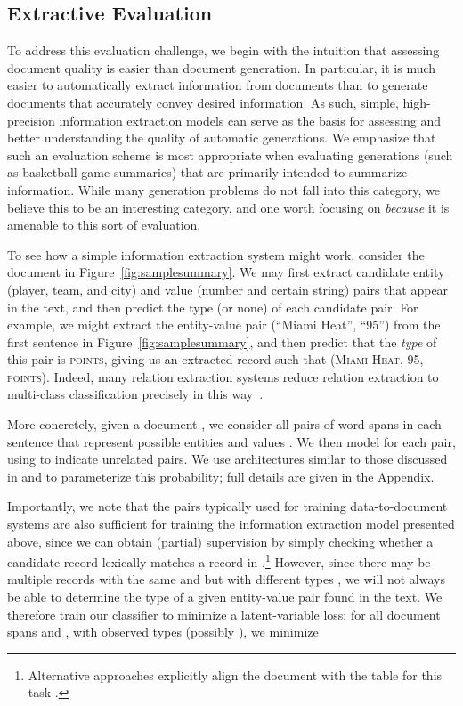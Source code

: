\documentclass[11pt,letterpaper]{article}
\begin{document}
\subsection{Extractive Evaluation}
\label{sec:extractive}
To address this evaluation challenge, we begin with the intuition that assessing document quality is easier than document generation. In particular, it is much easier to automatically extract information from documents than to generate documents that accurately convey desired information. As such, simple, high-precision information extraction models can serve
as the basis for assessing and better understanding the quality of automatic generations. 
We emphasize that such an evaluation scheme is most appropriate when evaluating generations (such as basketball game summaries) that are primarily intended to summarize information. While many generation problems do not fall into this category, we believe this to be an interesting category, and one worth focusing on \textit{because} it is amenable to this sort of evaluation.

To see how a simple information extraction system might work, consider the document in Figure~\ref{fig:samplesummary}. We may first extract candidate entity (player, team, and city) and value (number and
certain string) pairs  that appear in the text, and then predict the type  (or none) of each candidate pair. For example, we might extract the entity-value pair (``Miami Heat'', ``95'') from the first sentence in Figure~\ref{fig:samplesummary}, and then predict that the \textit{type} of this pair is \textsc{points}, giving us an extracted record  such that  (\textsc{Miami Heat}, 95, \textsc{points}). Indeed, many relation extraction systems
reduce relation extraction to multi-class classification precisely in this
way~\citep{zhang2004weakly,zhou2008semi,zeng2014relation,dosSantos2015classifying}. 

More concretely, given a document , we consider all pairs of word-spans in each sentence
that represent possible entities  and values . We then model
 for each pair, using  to
indicate unrelated pairs. We use architectures similar to those discussed in \citet{collobert2011natural} and
\citet{dosSantos2015classifying} to parameterize this probability; full details are given in the Appendix. 

Importantly, we note that the  pairs typically used for training data-to-document systems are also sufficient for training the information
extraction model presented above, since we can obtain (partial) supervision by simply checking whether
a candidate record lexically matches a record in .\footnote{Alternative approaches
  explicitly align the document with the table for this task \cite{liang2009learning}.} However, since there may be multiple records  with the same  and  but with different types , we will not always be able to determine the type of a given entity-value pair found in the text. We therefore train our classifier to
minimize a latent-variable loss: for all document spans  and , with observed types  (possibly ), we minimize
 
\end{document}
